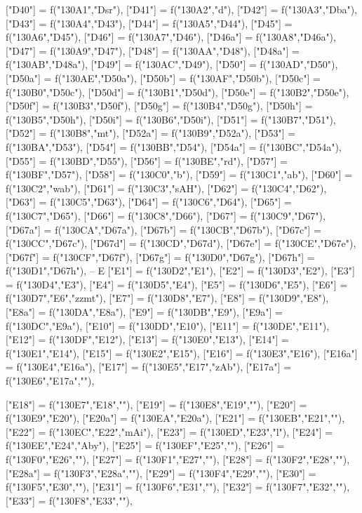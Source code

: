 \documentclass{article}
\begin{document}
\begin{luacode*}
{	["D40"] 		= f("130A1","Dsr"),
	["D41"] 		= f("130A2","d"),
	["D42"] 		= f("130A3","Dba"),
	["D43"] 		= f("130A4","D43"),
	["D44"] 		= f("130A5","D44"),
	["D45"] 		= f("130A6","D45"),
	["D46"] 		= f("130A7","D46"),
	["D46a"] 		= f("130A8","D46a"),
	["D47"] 		= f("130A9","D47"),
	["D48"] 		= f("130AA","D48"),
	["D48a"] 		= f("130AB","D48a"),
	["D49"] 		= f("130AC","D49"),
	["D50"] 		= f("130AD","D50"),
	["D50a"] 		= f("130AE","D50a"),
	["D50b"] 		= f("130AF","D50b"),
	["D50c"] 		= f("130B0","D50c"),
	["D50d"] 		= f("130B1","D50d"),
	["D50e"] 		= f("130B2","D50e"),
	["D50f"] 		= f("130B3","D50f"),
	["D50g"] 		= f("130B4","D50g"),
	["D50h"] 		= f("130B5","D50h"),
	["D50i"] 		= f("130B6","D50i"),
	["D51"] 		= f("130B7","D51"),
	["D52"] 		= f("130B8","mt"),
	["D52a"] 		= f("130B9","D52a"),
	["D53"] 		= f("130BA","D53"),
	["D54"] 		= f("130BB","D54"),
	["D54a"] 		= f("130BC","D54a"),
	["D55"] 		= f("130BD","D55"),
	["D56"] 		= f("130BE","rd"),
	["D57"] 		= f("130BF","D57"),
	["D58"] 		= f("130C0","b"),
	["D59"] 		= f("130C1","ab"),
	["D60"] 		= f("130C2","wab"),
	["D61"] 		= f("130C3","sAH"),
	["D62"] 		= f("130C4","D62"),
	["D63"] 		= f("130C5","D63"),
	["D64"] 		= f("130C6","D64"),
	["D65"] 		= f("130C7","D65"),
	["D66"] 		= f("130C8","D66"),
	["D67"] 		= f("130C9","D67"),
	["D67a"] 		= f("130CA","D67a"),
	["D67b"] 		= f("130CB","D67b"),
	["D67c"] 		= f("130CC","D67c"),
	["D67d"] 		= f("130CD","D67d"),
	["D67e"] 		= f("130CE","D67e"),
	["D67f"] 		= f("130CF","D67f"),
	["D67g"] 		= f("130D0","D67g"),
	["D67h"] 		= f("130D1","D67h"),
-- E 
   ["E1"] 		   = f("130D2","E1"),
   ["E2"] 		   = f("130D3","E2"),
   ["E3"] 		   = f("130D4","E3"),
   ["E4"] 		   = f("130D5","E4"),
   ["E5"] 		   = f("130D6","E5"),
	["E6"] 		   = f("130D7","E6","zzmt"),
   ["E7"] 		   = f("130D8","E7"),
   ["E8"] 		   = f("130D9","E8"),
   ["E8a"] 	   = f("130DA","E8a"),
   ["E9"] 		   = f("130DB","E9"),
   ["E9a"] 		= f("130DC","E9a"),
   ["E10"] 		= f("130DD","E10"),
	["E11"] 		= f("130DE","E11"),
	["E12"] 		= f("130DF","E12"),
	["E13"] 		= f("130E0","E13"),
	["E14"] 		= f("130E1","E14"),
	["E15"] 		= f("130E2","E15"),
	["E16"] 		= f("130E3","E16"),
	["E16a"] 		= f("130E4","E16a"),
	["E17"] 		= f("130E5","E17","zAb"),
	["E17a"] 		= f("130E6","E17a",""),

	["E18"] 		= f("130E7","E18",""),
	["E19"] 		= f("130E8","E19",""),
	["E20"] 		= f("130E9","E20"),
	["E20a"] 		= f("130EA","E20a"),
	["E21"] 		= f("130EB","E21",""),
	["E22"] 		= f("130EC","E22","mAi"),
	["E23"] 		= f("130ED","E23","l"),
	["E24"] 		= f("130EE","E24","Aby"),
	["E25"] 		= f("130EF","E25",""),
	["E26"] 		= f("130F0","E26",""),
	["E27"] 		= f("130F1","E27",""),
	["E28"] 		= f("130F2","E28",""),
	["E28a"] 		= f("130F3","E28a",""),
	["E29"] 		= f("130F4","E29",""),
	["E30"] 		= f("130F5","E30",""),
	["E31"] 		= f("130F6","E31",""),
	["E32"] 		= f("130F7","E32",""),
	["E33"] 		= f("130F8","E33",""),

}
\end{luacode*}
\end{document}

